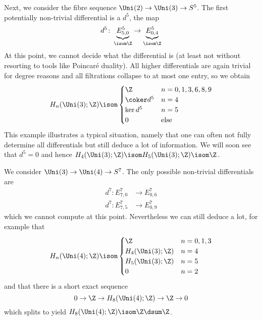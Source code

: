 \documentclass[wip, topology]{bsteffan-lecturenotes}
\begin{document}
\begin{example}
	Next, we consider the fibre sequence $\Uni(2) \to \Uni(3) \to S^5$.
	The first potentially non-trivial differential is a $d^5$, the map
	\begin{equation*}
		d^5\colon \underbrace{E^5_{5, 0}}_{\isom \Z} \to \underbrace{E^5_{0, 4}}_{\isom \Z}
	\end{equation*}
	At this point, we cannot decide what the differential is (at least not without resorting to tools like Poincaré duality).
	All higher differentials are again trivial for degree reasons and all filtrations collapse to at most one entry, so we obtain
	\begin{equation*}
		H_n(\Uni(3); \Z) \isom \begin{cases}
			\Z 			& n = 0, 1, 3, 6, 8, 9 \\
			\coker d^5 	& n = 4 \\
			\ker d^5 	& n = 5 \\
			0 			& \text{else}
		\end{cases}
	\end{equation*}
	This example illustrates a typical situation, namely that one can often not fully determine all differentials but still deduce a lot of information.
	We will soon see that $d^5 = 0$ and hence $H_4(\Uni(3); \Z) \isom H_5(\Uni(3); \Z) \isom \Z$.
\end{example}
\begin{example}
	We consider $\Uni(3) \to \Uni(4) \to S^7$.
	The only possible non-trivial differentials are
	\begin{align*}
		d^7\colon E^7_{7, 0} &\to E^7_{0, 6} \\
		d^7\colon E^7_{7, 5} &\to E^7_{0, 9}
	\end{align*}
	which we cannot compute at this point.
	Nevertheless we can still deduce a lot, for example that
	\begin{equation*}
		H_n(\Uni(4); \Z) \isom \begin{cases}
			\Z 					& n = 0, 1, 3 \\
			H_4(\Uni(3); \Z) 	& n = 4 \\
			H_5(\Uni(3); \Z) 	& n = 5 \\
			0 					& n = 2
		\end{cases}
	\end{equation*}
	and that there is a short exact sequence
	\begin{equation*}
		0 \to \Z \to H_8(\Uni(4); \Z) \to \Z \to 0
	\end{equation*}
	which splits to yield $H_8(\Uni(4); \Z) \isom \Z \dsum \Z$.
\end{example}
\end{document}

